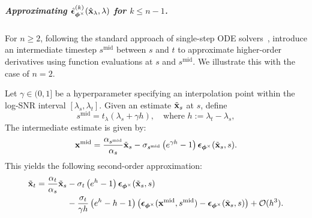 





\subparagraph{Approximating {\color{cyan}$\hat{\bm{\epsilon}}_{\bm{\phi}^\times}^{(k)}(\hat{{\mathbf{x}}}_\lambda,\lambda)$} for $k \leq n-1$.}
For $n \geq 2$, following the standard approach of single-step ODE solvers~\citep{atkinson2009numerical}, \citet{lu2022dpm} introduce an intermediate timestep $s^{\mathrm{mid}}$ between $s$ and $t$ to approximate higher-order derivatives using function evaluations at $s$ and $s^{\mathrm{mid}}$. We illustrate this with the case of $n = 2$.

Let $\gamma \in (0,1]$ be a hyperparameter specifying an interpolation point within the log-SNR interval $[\lambda_s, \lambda_t]$. 
Given an estimate $\tilde{{\mathbf{x}}}_s$ at $s$, define
\[
    s^{\mathrm{mid}} = t_\lambda\left(\lambda_s + \gamma h\right), \quad \text{where } h := \lambda_t - \lambda_s,
\]
The intermediate estimate is given by:
\[
    {\mathbf{x}}^{\mathrm{mid}} = \frac{\alpha_{s^{\mathrm{mid}}}}{\alpha_s} \tilde{{\mathbf{x}}}_s - \sigma_{s^{\mathrm{mid}}} \left(e^{\gamma h} - 1\right) \bm{\epsilon}_{\bm{\phi}^\times}(\tilde{{\mathbf{x}}}_s, s).
\]
This yields the following second-order approximation:
\begin{align}
\label{eq:dpm-solver-2-app}
\begin{aligned}
    \tilde{{\mathbf{x}}}_{t} = \frac{\alpha_{t}}{\alpha_s} \tilde{{\mathbf{x}}}_s 
    &- \sigma_{t} \left(e^{h} - 1\right) \bm{\epsilon}_{\bm{\phi}^\times}(\tilde{{\mathbf{x}}}_s, s) \\
    &- \frac{\sigma_t}{\gamma h} \left(e^{h} - h - 1\right) \left( \bm{\epsilon}_{\bm{\phi}^\times}({\mathbf{x}}^{\mathrm{mid}}, s^{\mathrm{mid}}) - \bm{\epsilon}_{\bm{\phi}^\times}(\tilde{{\mathbf{x}}}_s, s) \right)
     +  \mathcal{O}(h^3).
\end{aligned}
\end{align}


